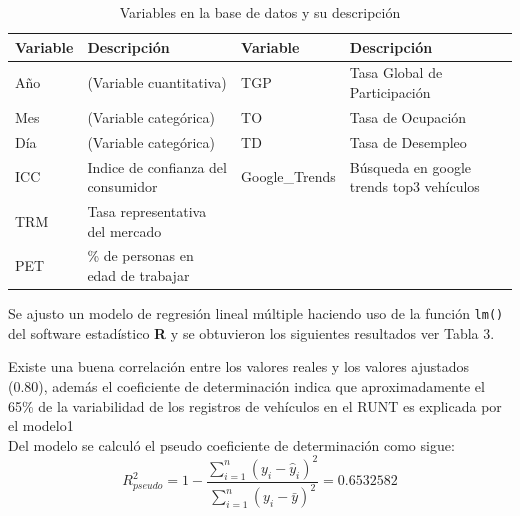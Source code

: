 \documentclass[11pt,twoside]{article}
\begin{document}
\begin{table}[H]
\caption{\small{Variables en la base de datos y su descripción}}
\begin{tabular}{@{}llll@{}}
\toprule
Variable & Descripción & Variable & Descripción \\ \midrule
Año & (Variable cuantitativa) & TGP & Tasa Global de Participación \\
Mes & (Variable categórica) & TO & Tasa de Ocupación \\
Día & (Variable categórica) & TD & Tasa de Desempleo \\
ICC & Indice de confianza del consumidor & Google{\_}Trends & Búsqueda en google trends top3 vehículos \\
TRM & Tasa representativa del mercado &  & \\
PET & \% de personas en edad de trabajar &  &  \\ \bottomrule
\end{tabular}
\end{table}
\noindent Se ajusto un modelo de regresión lineal múltiple haciendo uso de la función \texttt{lm()} del software estadístico \textbf{R} y se obtuvieron los siguientes resultados ver Tabla 3.


\begin{table}[h]
	\caption{\small{Resumen del modelo1}}
	\label{tabla1}
\end{table}
\noindent Existe una buena correlación entre los valores reales y los valores ajustados (0.80), además el coeficiente de determinación indica que aproximadamente el 65{\%} de la variabilidad de los registros de vehículos en el RUNT es explicada por el modelo1
\\

\noindent Del modelo se calculó el pseudo coeficiente de determinación como sigue:
\\
\begin{equation}
    { R }^{ 2 }_{pseudo}=1-\frac { \sum _{ i=1 }^{ n }{ { ({ y }_{ i }-{ \hat { y }  }_{ i }) }^{ 2 } }  }{ \sum _{ i=1 }^{ n }{ { ({ y }_{ i }-{ \bar { y }  }) }^{ 2 } }  }  = 0.6532582
\end{equation}
\end{document}

